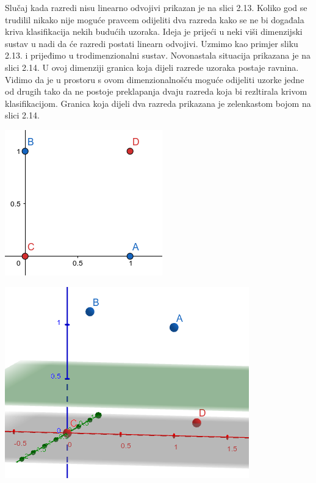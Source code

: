 \documentclass[times, utf8, zavrsni, numeric]{fer}
\begin{document}
\begin{multicols}{2}
Slučaj kada razredi nisu linearno odvojivi prikazan je na slici 2.13. Koliko god se trudilil nikako 
nije moguće pravcem odijeliti dva razreda kako se ne bi događala kriva klasifikacija nekih 
budućih uzoraka. Ideja je prijeći u neki viši dimenzijski sustav u nadi da će razredi postati 
linearn odvojivi. Uzmimo kao primjer sliku 2.13. i prijeđimo u trodimenzionalni sustav. Novonastala 
situacija prikazana je na slici 2.14. U ovoj dimenziji granica koja dijeli razrede uzoraka 
postaje ravnina. Vidimo da je u prostoru s ovom dimenzionalnošću moguće odijeliti uzorke jedne 
od drugih tako da ne postoje preklapanja dvaju razreda koja bi rezltirala krivom klasifikacijom.
Granica koja dijeli dva razreda prikazana je zelenkastom bojom na slici 2.14.

\begin{minipage}{\linewidth}
\vspace{10pt}
\centering
\includegraphics[width=0.8\linewidth]{img/neseparabilni.png}
\end{minipage}
\end{multicols}


\begin{minipage}{\linewidth}
\vspace{10pt}
\centering
\includegraphics[width=0.7\linewidth]{img/3d.png}
\end{minipage}
\end{document}
